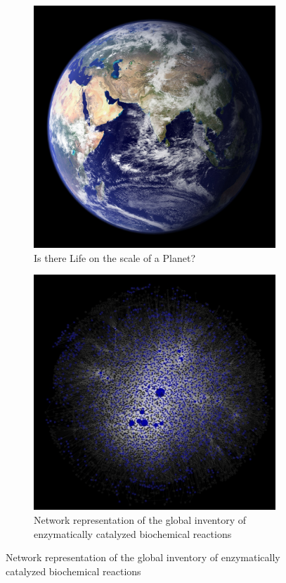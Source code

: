 \documentclass[]{article}
\begin{document}
\begin{figure}[H]
	\begin{subfigure}[t]{0.45\textwidth}
		\caption{Is there Life on the scale of a Planet?}\label{fig:gaia}
		\includegraphics[width=\textwidth]{Globe1}
	\end{subfigure}
	\begin{subfigure}[t]{0.45\textwidth}
		\caption{Network representation of the global inventory of
			enzymatically catalyzed biochemical reactions}\label{fig:gaia:network}
		\includegraphics[width=\textwidth]{Globe2}
	\end{subfigure}
\end{figure}
\end{document}
